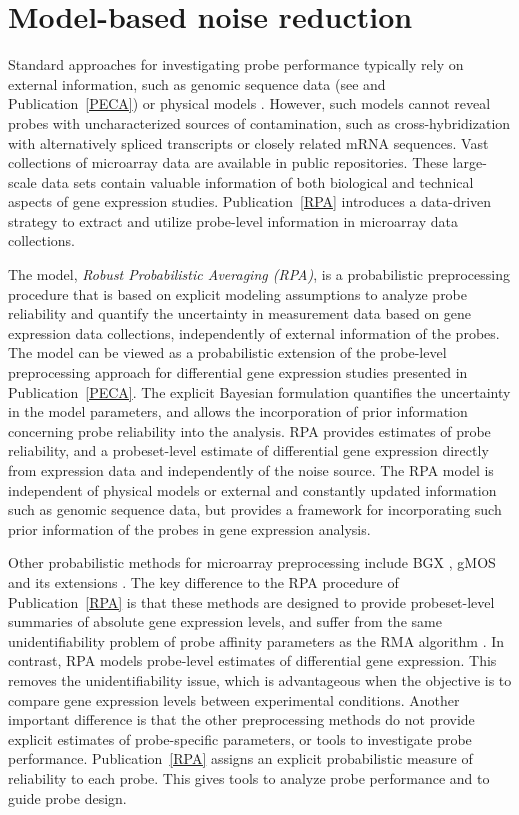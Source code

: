 \section{Model-based noise reduction}\label{sec:modelnoise}

Standard approaches for investigating probe performance typically rely
on external information, such as genomic sequence data (see
\citealt{Mecham04b, Zhang05} and Publication~\ref{PECA}) or physical
models \citep{Naef03,Wu05}. However, such models cannot reveal probes
with uncharacterized sources of contamination, such as
cross-hybridization with alternatively spliced transcripts or closely
related mRNA sequences.  Vast collections of microarray data are
available in public repositories. These large-scale data sets contain
valuable information of both biological and technical aspects of gene
expression studies. Publication~\ref{RPA} introduces a data-driven
strategy to extract and utilize probe-level information in microarray
data collections.

The model, {\it Robust Probabilistic Averaging (RPA)}, is a
probabilistic preprocessing procedure that is based on explicit
modeling assumptions to analyze probe reliability and quantify the
uncertainty in measurement data based on gene expression data
collections, independently of external information of the probes. The
model can be viewed as a probabilistic extension of the probe-level
preprocessing approach for differential gene expression studies
presented in Publication~\ref{PECA}.  The explicit Bayesian
formulation quantifies the uncertainty in the model parameters, and
allows the incorporation of prior information concerning probe
reliability into the analysis. RPA provides estimates of probe
reliability, and a probeset-level estimate of differential gene
expression directly from expression data and independently of the
noise source. The RPA model is independent of physical models or
external and constantly updated information such as genomic sequence
data, but provides a framework for incorporating such prior
information of the probes in gene expression analysis.

Other probabilistic methods for microarray preprocessing include BGX
\citep{Hein05}, gMOS \citep{Milo03} and its extensions
\citep{Liu05}. The key difference to the RPA procedure of
Publication~\ref{RPA} is that these methods are designed to provide
probeset-level summaries of absolute gene expression levels, and
suffer from the same unidentifiability problem of probe affinity
parameters as the RMA algorithm \citep{Irizarry03rma}. In contrast,
RPA models probe-level estimates of differential gene expression. This
removes the unidentifiability issue, which is advantageous when the
objective is to compare gene expression levels between experimental
conditions. Another important difference is that the other
preprocessing methods do not provide explicit estimates of
probe-specific parameters, or tools to investigate probe performance.
Publication~\ref{RPA} assigns an explicit probabilistic measure of
reliability to each probe. This gives tools to analyze probe
performance and to guide probe design.


